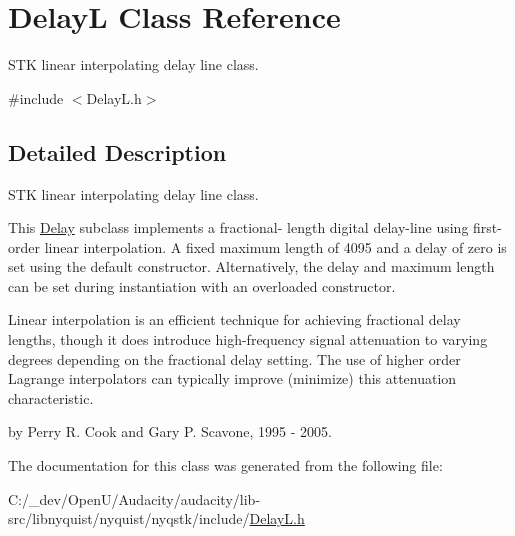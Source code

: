 \hypertarget{class_delay_l}{}\section{DelayL Class Reference}
\label{class_delay_l}


S\+TK linear interpolating delay line class.  




{\ttfamily \#include $<$Delay\+L.\+h$>$}



\subsection{Detailed Description}
S\+TK linear interpolating delay line class. 

This \hyperlink{class_delay}{Delay} subclass implements a fractional-\/ length digital delay-\/line using first-\/order linear interpolation. A fixed maximum length of 4095 and a delay of zero is set using the default constructor. Alternatively, the delay and maximum length can be set during instantiation with an overloaded constructor.

Linear interpolation is an efficient technique for achieving fractional delay lengths, though it does introduce high-\/frequency signal attenuation to varying degrees depending on the fractional delay setting. The use of higher order Lagrange interpolators can typically improve (minimize) this attenuation characteristic.

by Perry R. Cook and Gary P. Scavone, 1995 -\/ 2005. 

The documentation for this class was generated from the following file\+:\begin{DoxyCompactItemize}
\item 
C\+:/\+\_\+dev/\+Open\+U/\+Audacity/audacity/lib-\/src/libnyquist/nyquist/nyqstk/include/\hyperlink{_delay_l_8h}{Delay\+L.\+h}\end{DoxyCompactItemize}
